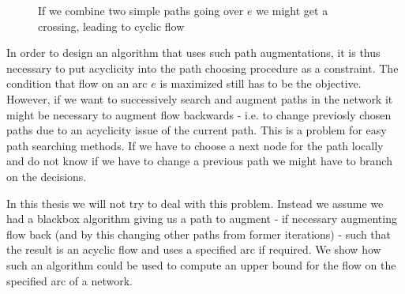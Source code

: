 \begin{figure}[h!]
\centering
{}
\caption{If we combine two simple paths going over $e$ we might get a crossing, leading to cyclic flow}
 \label{bild:cycleFromDifferentCombinedPaths}
\end{figure}

In order to design an algorithm that uses such path augmentations, it is thus necessary to put acyclicity into the path 
choosing procedure as a constraint. The condition that flow on an arc $e$ is maximized still has to be the objective.
However, if we want to successively search and augment paths in the network it might be necessary to augment flow 
backwards - i.e. to change previosly chosen paths due to an acyclicity issue of the current path.
This is a problem for easy path searching methods. If we have to choose a next node for the path locally and do not 
know if we have to change a previous path we might have to branch on the decisions.  

In this thesis we will not try to deal with this problem. Instead we assume we had a blackbox algorithm giving us 
a path to augment - if necessary augmenting flow back (and by this changing other paths from former iterations) - such 
that the result is an acyclic flow and uses a specified arc if required. We show how such an algorithm could be used to 
compute an upper bound for the flow on the specified arc of a network.\\


